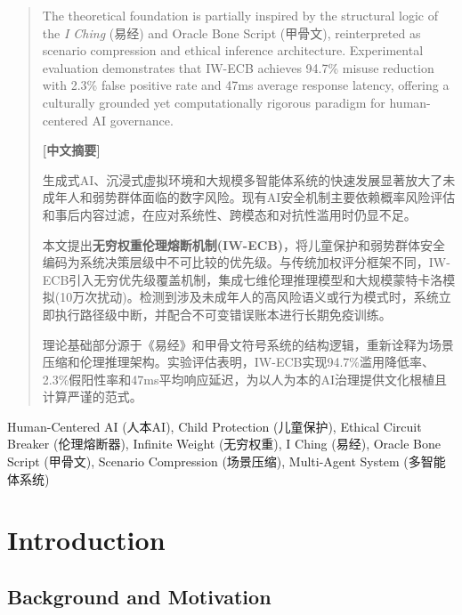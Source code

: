 \documentclass[conference]{IEEEtran}
\begin{document}
\begin{CJK}{UTF8}{gbsn}
\begin{abstract}
The theoretical foundation is partially inspired by the structural logic of the \textit{I Ching} (易经) and Oracle Bone Script (甲骨文), reinterpreted as scenario compression and ethical inference architecture. Experimental evaluation demonstrates that IW-ECB achieves 94.7\% misuse reduction with 2.3\% false positive rate and 47ms average response latency, offering a culturally grounded yet computationally rigorous paradigm for human-centered AI governance.

\vspace{0.3cm}
\noindent\textbf{[中文摘要]}

生成式AI、沉浸式虚拟环境和大规模多智能体系统的快速发展显著放大了未成年人和弱势群体面临的数字风险。现有AI安全机制主要依赖概率风险评估和事后内容过滤，在应对系统性、跨模态和对抗性滥用时仍显不足。

本文提出\textbf{无穷权重伦理熔断机制(IW-ECB)}，将儿童保护和弱势群体安全编码为系统决策层级中不可比较的优先级。与传统加权评分框架不同，IW-ECB引入无穷优先级覆盖机制，集成七维伦理推理模型和大规模蒙特卡洛模拟(10万次扰动)。检测到涉及未成年人的高风险语义或行为模式时，系统立即执行路径级中断，并配合不可变错误账本进行长期免疫训练。

理论基础部分源于《易经》和甲骨文符号系统的结构逻辑，重新诠释为场景压缩和伦理推理架构。实验评估表明，IW-ECB实现94.7\%滥用降低率、2.3\%假阳性率和47ms平均响应延迟，为以人为本的AI治理提供文化根植且计算严谨的范式。
\end{abstract}

\begin{IEEEkeywords}
Human-Centered AI (人本AI), Child Protection (儿童保护), Ethical Circuit Breaker (伦理熔断器), Infinite Weight (无穷权重), I Ching (易经), Oracle Bone Script (甲骨文), Scenario Compression (场景压缩), Multi-Agent System (多智能体系统)
\end{IEEEkeywords}

\section{Introduction}

\subsection{Background and Motivation}


\end{CJK}
\end{document}
